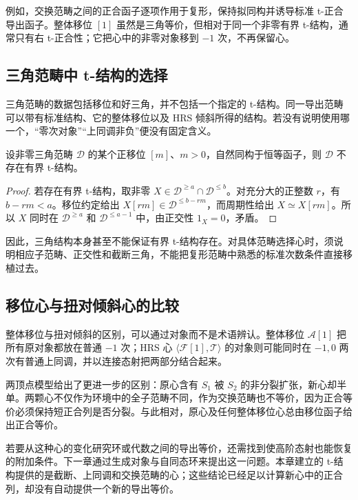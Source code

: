 例如，交换范畴之间的正合函子逐项作用于复形，保持拟同构并诱导标准 t-正合导出函子。整体移位 \([1]\) 虽然是三角等价，但相对于同一个非零有界 t-结构，通常只有右 t-正合性；它把心中的非零对象移到 \(-1\) 次，不再保留心。

\subsection{三角范畴中 t-结构的选择}
\label{b4:subsec:1906:03}

三角范畴的数据包括移位和好三角，并不包括一个指定的 t-结构。同一导出范畴可以带有标准结构、它的整体移位以及 HRS 倾斜所得的结构。若没有说明使用哪一个，“零次对象”“上同调非负”便没有固定含义。

\begin{proposition}\label{b4:prop:periodic-no-bounded-t}
	设非零三角范畴 \(\mathcal D\) 的某个正移位 \([m]\)、\(m>0\)，自然同构于恒等函子，则 \(\mathcal D\) 不存在有界 t-结构。
\end{proposition}
\begin{proof}
	若存在有界 t-结构，取非零 \(X\in\mathcal D^{\ge a}\cap\mathcal D^{\le b}\)。对充分大的正整数 \(r\)，有 \(b-rm<a\)。移位约定给出 \(X[rm]\in\mathcal D^{\le b-rm}\)，而周期性给出 \(X\simeq X[rm]\)。所以 \(X\) 同时在 \(\mathcal D^{\ge a}\) 和 \(\mathcal D^{\le a-1}\) 中，由正交性 \(1_X=0\)，矛盾。
\end{proof}

因此，三角结构本身甚至不能保证有界 t-结构存在。对具体范畴选择心时，须说明相应子范畴、正交性和截断三角，不能把复形范畴中熟悉的标准次数条件直接移植过去。

\subsection{移位心与扭对倾斜心的比较}
\label{b4:subsec:1906:04}

整体移位与扭对倾斜的区别，可以通过对象而不是术语辨认。整体移位 \(\mathcal A[1]\) 把所有原对象都放在普通 \(-1\) 次；HRS 心 \(\langle\mathcal F[1],\mathcal T\rangle\) 的对象则可能同时在 \(-1,0\) 两次有普通上同调，并以连接态射把两部分结合起来。

\ProseParagraphBreak
两顶点模型给出了更进一步的区别：原心含有 \(S_1\) 被 \(S_2\) 的非分裂扩张，新心却半单。两颗心不仅作为环境中的全子范畴不同，作为交换范畴也不等价，因为正合等价必须保持短正合列是否分裂。与此相对，原心及任何整体移位心总由移位函子给出正合等价。

\ProseParagraphBreak
若要从这种心的变化研究环或代数之间的导出等价，还需找到使高阶态射也能恢复的附加条件。下一章通过生成对象与自同态环来提出这一问题。本章建立的 t-结构提供的是截断、上同调和交换范畴的心；这些结论已经足以计算新心中的正合列，却没有自动提供一个新的导出等价。
